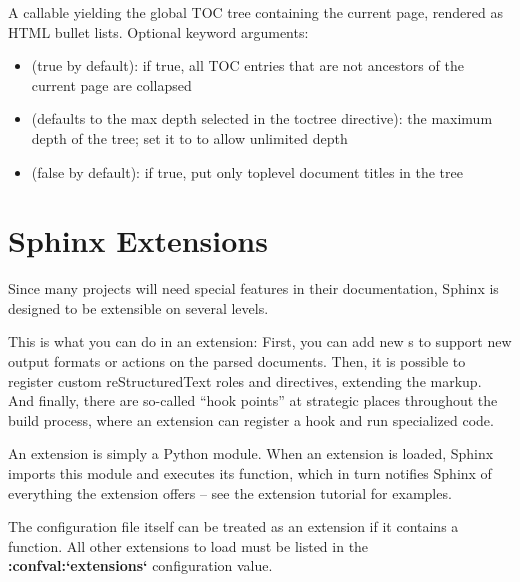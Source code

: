 \documentclass[letterpaper,10pt,english]{sphinxmanual}
\begin{document}
\begin{fulllineitems}
\label{templating:toctree}
A callable yielding the global TOC tree containing the current page, rendered
as HTML bullet lists.  Optional keyword arguments:
\begin{itemize}
\item {} 
 (true by default): if true, all TOC entries that are not
ancestors of the current page are collapsed

\item {} 
 (defaults to the max depth selected in the toctree directive):
the maximum depth of the tree; set it to  to allow unlimited depth

\item {} 
 (false by default): if true, put only toplevel document
titles in the tree

\end{itemize}

\end{fulllineitems}



\chapter{Sphinx Extensions}
\label{extensions:sphinx-extensions}\label{extensions:extensions}\label{extensions:module-sphinx.application}\label{extensions::doc}
Since many projects will need special features in their documentation, Sphinx is
designed to be extensible on several levels.

This is what you can do in an extension: First, you can add new
{\hyperref[glossary:term\string-builder]{}}s to support new output formats or actions on the parsed
documents.  Then, it is possible to register custom reStructuredText roles and
directives, extending the markup.  And finally, there are so-called ``hook
points'' at strategic places throughout the build process, where an extension can
register a hook and run specialized code.

An extension is simply a Python module.  When an extension is loaded, Sphinx
imports this module and executes its  function, which in turn
notifies Sphinx of everything the extension offers -- see the extension tutorial
for examples.

The configuration file itself can be treated as an extension if it contains a
 function.  All other extensions to load must be listed in the
{\color{red}\bfseries{}:confval:{}`extensions{}`} configuration value.
\end{document}
